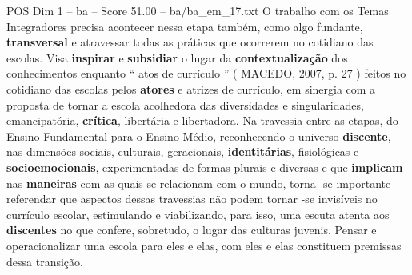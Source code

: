 \begin{textsample}{POS Dim 1 – ba – Score 51.00 – ba/ba\_em\_17.txt}
O trabalho com os Temas Integradores precisa acontecer nessa etapa também, como algo fundante, \textbf{transversal} e atravessar todas as práticas que ocorrerem no cotidiano das escolas.
Visa \textbf{inspirar} e \textbf{subsidiar} o lugar da \textbf{contextualização} dos conhecimentos enquanto “ atos de currículo ” ( MACEDO, 2007, p. 27 ) feitos no cotidiano das escolas pelos \textbf{atores} e atrizes de currículo, em sinergia com a proposta de tornar a escola acolhedora das diversidades e singularidades, emancipatória, \textbf{crítica}, libertária e libertadora.
Na travessia entre as etapas, do Ensino Fundamental para o Ensino Médio, reconhecendo o universo \textbf{discente}, nas dimensões sociais, culturais, geracionais, \textbf{identitárias}, fisiológicas e \textbf{socioemocionais}, experimentadas de formas plurais e diversas e que \textbf{implicam} nas \textbf{maneiras} com as quais se relacionam com o mundo, torna -se importante referendar que aspectos dessas travessias não podem tornar -se invisíveis no currículo escolar, estimulando e viabilizando, para isso, uma escuta atenta aos \textbf{discentes} no que confere, sobretudo, o lugar das culturas juvenis.
Pensar e operacionalizar uma escola para eles e elas, com eles e elas constituem premissas dessa transição.

\end{textsample}
